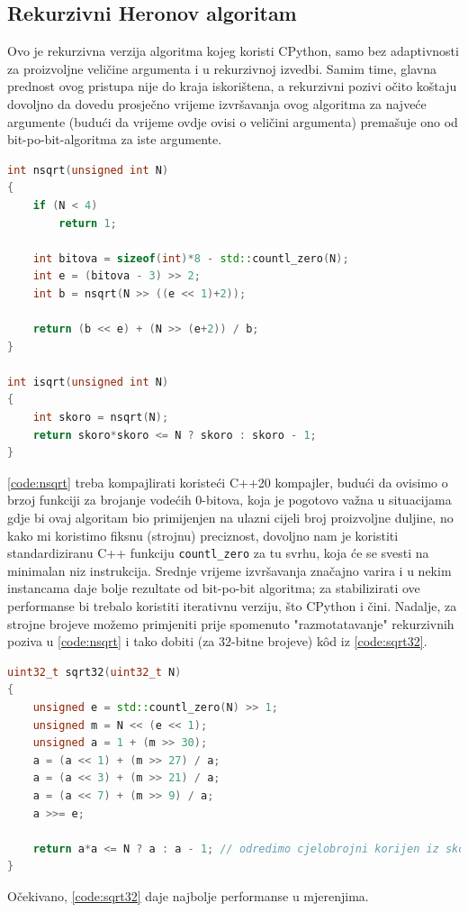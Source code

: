 \documentclass[12pt]{scrartcl}
\begin{document}
\subsection{Rekurzivni Heronov algoritam}
Ovo je rekurzivna verzija algoritma kojeg koristi CPython, samo bez adaptivnosti za proizvoljne veličine argumenta i u rekurzivnoj izvedbi.
Samim time, glavna prednost ovog pristupa nije do kraja iskorištena, a rekurzivni pozivi očito koštaju dovoljno da dovedu prosječno vrijeme izvršavanja
ovog algoritma za najveće argumente (budući da vrijeme ovdje ovisi o veličini argumenta) premašuje ono od bit-po-bit-algoritma za iste argumente.
\begin{lstlisting}[language=C++, label=code:nsqrt, caption=Rekurzivna C++20 implementacija Heronove metode]
int nsqrt(unsigned int N)
{
    if (N < 4)
        return 1;

    int bitova = sizeof(int)*8 - std::countl_zero(N);
    int e = (bitova - 3) >> 2;
    int b = nsqrt(N >> ((e << 1)+2));

    return (b << e) + (N >> (e+2)) / b;
}

int isqrt(unsigned int N)
{
    int skoro = nsqrt(N);
    return skoro*skoro <= N ? skoro : skoro - 1;
}
\end{lstlisting}
\autoref{code:nsqrt} treba kompajlirati koristeći C++20 kompajler, budući da ovisimo o brzoj funkciji za brojanje vodećih $0$-bitova, koja je pogotovo
važna u situacijama gdje bi ovaj algoritam bio primijenjen na ulazni cijeli broj proizvoljne duljine, no kako mi koristimo fiksnu (strojnu) preciznost,
dovoljno nam je koristiti standardiziranu C++ funkciju \texttt{countl\_zero} za tu svrhu, koja će se svesti na minimalan niz instrukcija.
Srednje vrijeme izvršavanja značajno varira i u nekim instancama daje bolje rezultate od bit-po-bit
algoritma; za stabilizirati ove performanse bi trebalo koristiti iterativnu verziju, što CPython i čini. Nadalje, za strojne brojeve možemo
primjeniti prije spomenuto "razmotatavanje" rekurzivnih poziva
u \autoref{code:nsqrt} i tako dobiti (za $32$-bitne brojeve) k\^od iz \autoref{code:sqrt32}.
\begin{lstlisting}[language=C++, label=code:sqrt32, caption=C++20 implementacija algoritma za $32$-bitne argumente~\cite{mdickpaper}]
uint32_t sqrt32(uint32_t N)
{
    unsigned e = std::countl_zero(N) >> 1;
    unsigned m = N << (e << 1);
    unsigned a = 1 + (m >> 30);
    a = (a << 1) + (m >> 27) / a;
    a = (a << 3) + (m >> 21) / a;
    a = (a << 7) + (m >> 9) / a;
    a >>= e;

    return a*a <= N ? a : a - 1; // odredimo cjelobrojni korijen iz skoro-korijena
}
\end{lstlisting}
Očekivano, \autoref{code:sqrt32} daje najbolje performanse u mjerenjima.
\end{document}
